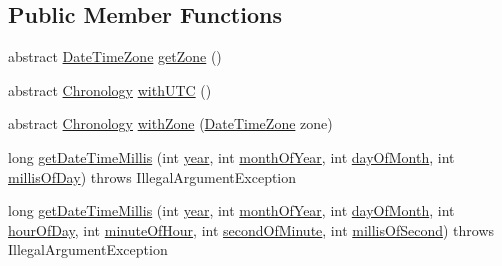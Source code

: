 \subsection*{Public Member Functions}
\begin{DoxyCompactItemize}
\item 
abstract \hyperlink{classorg_1_1joda_1_1time_1_1_date_time_zone}{Date\-Time\-Zone} \hyperlink{classorg_1_1joda_1_1time_1_1chrono_1_1_base_chronology_a9d32c6064f195874b4d55c00da03742e}{get\-Zone} ()
\item 
abstract \hyperlink{classorg_1_1joda_1_1time_1_1_chronology}{Chronology} \hyperlink{classorg_1_1joda_1_1time_1_1chrono_1_1_base_chronology_a839fd4261bb4f4cfcb1eb56dcebbec70}{with\-U\-T\-C} ()
\item 
abstract \hyperlink{classorg_1_1joda_1_1time_1_1_chronology}{Chronology} \hyperlink{classorg_1_1joda_1_1time_1_1chrono_1_1_base_chronology_a63d48bcfe7b36b349c8afb8289b94b0b}{with\-Zone} (\hyperlink{classorg_1_1joda_1_1time_1_1_date_time_zone}{Date\-Time\-Zone} zone)
\item 
long \hyperlink{classorg_1_1joda_1_1time_1_1chrono_1_1_base_chronology_a99c43b63b921b12c4b4cc1358814f7f4}{get\-Date\-Time\-Millis} (int \hyperlink{classorg_1_1joda_1_1time_1_1chrono_1_1_base_chronology_a42ca18fc2242013e39e4cd03f953604c}{year}, int \hyperlink{classorg_1_1joda_1_1time_1_1chrono_1_1_base_chronology_ac25016b89115973759aea2d05fcc174b}{month\-Of\-Year}, int \hyperlink{classorg_1_1joda_1_1time_1_1chrono_1_1_base_chronology_a373dfe3e62060acbd5af63b129e1c399}{day\-Of\-Month}, int \hyperlink{classorg_1_1joda_1_1time_1_1chrono_1_1_base_chronology_a1992466a44f36d78e72ef6a0cef96c8c}{millis\-Of\-Day})  throws Illegal\-Argument\-Exception     
\item 
long \hyperlink{classorg_1_1joda_1_1time_1_1chrono_1_1_base_chronology_a08669ffdafca9f6d5034ee598c3e0ecc}{get\-Date\-Time\-Millis} (int \hyperlink{classorg_1_1joda_1_1time_1_1chrono_1_1_base_chronology_a42ca18fc2242013e39e4cd03f953604c}{year}, int \hyperlink{classorg_1_1joda_1_1time_1_1chrono_1_1_base_chronology_ac25016b89115973759aea2d05fcc174b}{month\-Of\-Year}, int \hyperlink{classorg_1_1joda_1_1time_1_1chrono_1_1_base_chronology_a373dfe3e62060acbd5af63b129e1c399}{day\-Of\-Month}, int \hyperlink{classorg_1_1joda_1_1time_1_1chrono_1_1_base_chronology_a3b0ccfe1a1135c79c1d4bef15391c59d}{hour\-Of\-Day}, int \hyperlink{classorg_1_1joda_1_1time_1_1chrono_1_1_base_chronology_acd0a59c7a543845ca3f42583863bd287}{minute\-Of\-Hour}, int \hyperlink{classorg_1_1joda_1_1time_1_1chrono_1_1_base_chronology_a40ab89120f00f86b8c126fbf9b953ea6}{second\-Of\-Minute}, int \hyperlink{classorg_1_1joda_1_1time_1_1chrono_1_1_base_chronology_ab5bc4a6f6580c071e8bf141f2722a828}{millis\-Of\-Second})  throws Illegal\-Argument\-Exception     

\end{DoxyCompactItemize}
